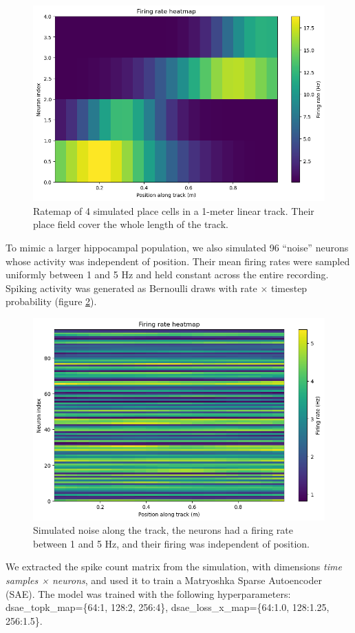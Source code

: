 \begin{figure}
    \centering
    \includegraphics[width=0.75\linewidth]{paper/figures/place_cells_ratemap.png}
    \caption{Ratemap of 4 simulated place cells in a 1-meter linear track. Their place field cover the whole length of the track. }
    \label{figure:ratemap_placeCells}
\end{figure}

To mimic a larger hippocampal population, we also simulated 96 “noise” neurons whose activity was independent of position. Their mean firing rates were sampled uniformly between 1 and 5 Hz and held constant across the entire recording. Spiking activity was generated as Bernoulli draws with rate × timestep probability (figure \ref{figure:ratemap_noise}). 

\begin{figure}
    \centering
    \includegraphics[width=0.75\linewidth]{paper/figures/noise_ratemap.png}
    \caption{Simulated noise along the track, the neurons had a firing rate between 1 and 5 Hz, and their firing was independent of position.}
    \label{figure:ratemap_noise}
\end{figure}

We extracted the spike count matrix from the simulation, with dimensions \textit{time samples × neurons}, and used it to train a Matryoshka Sparse Autoencoder (SAE). The model was trained with the following hyperparameters: dsae\_topk\_map=\{64:1, 128:2, 256:4\}, dsae\_loss\_x\_map=\{64:1.0, 128:1.25, 256:1.5\}.

